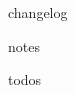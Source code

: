 \documentclass[../main.tex]{subfiles}
\begin{document}


{changelog}

{notes}

{todos}

\end{document}
